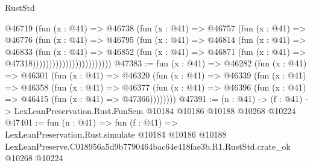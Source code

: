 \begin{lexlean}{RustStd}
\begin{coremodule}
                                @46719
                                  (fun (x : @41) =>
                                  @46738
                                    (fun (x : @41) =>
                                    @46757
                                      (fun (x : @41) =>
                                      @46776
                                        (fun (x : @41) =>
                                        @46795
                                          (fun (x : @41) =>
                                          @46814
                                            (fun (x : @41) =>
                                            @46833
                                              (fun (x : @41) =>
                                              @46852
                                                (fun (x : @41) =>
                                                @46871
                                                  (fun (x : @41) => @47318))))))))))))))))))))))))
@47383 := fun (x : @41) =>
  @46282
    (fun (x : @41) =>
    @46301
      (fun (x : @41) =>
      @46320
        (fun (x : @41) =>
        @46339
          (fun (x : @41) =>
          @46358
            (fun (x : @41) =>
            @46377
              (fun (x : @41) => @46396 (fun (x : @41) => @46415 (fun (x : @41) => @47366))))))))
@47391 := (n : @41) ->
  (f : @41) -> LexLeanPreservation.Rust.FunSem @10184 @10186 @10188 @10268 @10224
@47401 := fun (n : @41) =>
  fun (f : @41) =>
  LexLeanPreservation.Rust.simulate
    @10184
    @10186
    @10188
    LexLeanPreserve.C018956a5d9b7790464bac64e418fae3b.R1.RustStd.crate_ok
    @10268
    @10224
\end{coremodule}
\end{lexlean}
